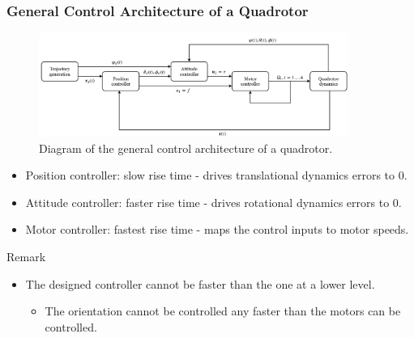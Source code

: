 \documentclass{thesisbeamer}
\newcommand\Fontvi{\fontsize{9}{10}\selectfont}
\begin{document}
\begin{frame}

\end{frame}

\begin{frame}
\frametitle{General Control Architecture of a Quadrotor}

	\Fontvi	
		
	\begin{figure}
		\centering
		\includegraphics[width=0.9\textwidth]{diagrams/general_control_architecture.png}
		\caption{Diagram of the general control architecture of a quadrotor.}
	\end{figure}
	\begin{itemize} %
		\item Position controller: slow rise time - drives translational dynamics errors to 0.
		\item Attitude controller: faster rise time - drives rotational dynamics errors to 0.
		\item Motor controller: fastest rise time - maps the control inputs to motor speeds.
	\end{itemize}
	\begingroup
    \fontsize{9pt}{10pt}\selectfont
    \begin{alertblock}{Remark}
		\begin{itemize}
			\item The designed controller cannot be faster than the one at a lower level.
				\begin{itemize}
					\item \fontsize{9pt}{10pt}\selectfont The orientation cannot be controlled any faster than the motors can be controlled.
				\end{itemize}
		\end{itemize}
		\end{alertblock}
\endgroup						
\end{frame}
\end{document}
